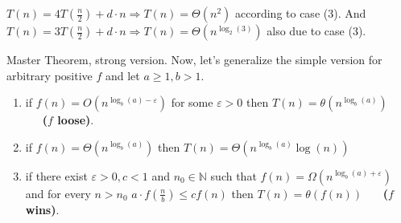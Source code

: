 \begin{example}  \( T\left(n\right)  =4T\left(\frac{n}{2}\right)+d\cdot n \Rightarrow
T\left(n\right) = \Theta\left(n^2\right)\) according to case (3). And \(T\left(n\right)  = 3T\left(\frac{n}{2}\right) + d\cdot n \Rightarrow T\left(n\right) = \Theta \left( n^{\log_{2}\left(3\right)}\right)\)
also due to case (3).
\end{example}
\begin{defbox}{Master Theorem, strong version.} 
Now, let's generalize the simple version for arbitrary positive \(f\) and let \( a \ge 1, b > 1\). 

\newcommand{\logab}{\log_{b} \left(a\right)}

\begin{enumerate}
    \item if  \(f\left(n\right) = O \left( n^{\logab - \varepsilon }\right)\) for some \( \varepsilon > 0 \) then \( T\left(n\right) = \theta \left( n^{\logab} \right) \) \ \ \ \textbf{(\(f\) loose)}.
    
    \item if  \(f\left(n\right) = \Theta \left( n^{\logab} \right) \) then \( T\left(n\right) = \Theta \left( n^{\logab}  \log\left(n\right)\right) \)
    
    \item if there exist \(\varepsilon >0 ,c<1\) and \(n_0 \in \mathbb{N} \) such that  \(f\left(n\right) = \Omega \left( n^{\logab + \varepsilon }\right)\) and for every \( n > n_0 \) \(a \cdot f\left( \frac{n}{b} \right) \le c f\left(n\right)\)  then \( T\left(n\right) = \theta \left( f\left(n\right) \right) \) \ \ \ \textbf{(\(f\) wins)}.
    
\end{enumerate}
\end{defbox}
\newcommand{\TT}[2]{#1 T\left(\frac{n}{#2}\right)}

